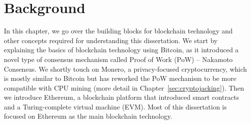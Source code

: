 


\chapter{Background} \label{sec:background}

In this chapter, we go over the building blocks for blockchain technology and other concepts required for understanding this dissertation. We start by explaining the basics of blockchain technology using Bitcoin, as it introduced a novel type of consensus mechanism called Proof of Work (PoW) -- Nakamoto Consensus. We shortly touch on Monero, a privacy-focused cryptocurrency, which is mostly similar to Bitcoin but has reworked the PoW mechanism to be more compatible with CPU mining (more detail in Chapter~\ref{sec:cryptojacking}). Then we introduce Ethereum, a blockchain platform that introduced smart contracts and a Turing-complete virtual machine (EVM). Most of this dissertation is focused on Ethereum as the main blockchain technology.

\begin{table}[]
    \centering
    \caption[Chapters and the related blockchains]{Mapping of chapters to blockchain systems related to the concepts discussed in each chapter.}
    \label{tab:chapters}
\end{table}



